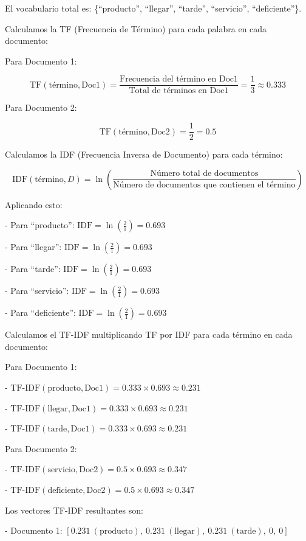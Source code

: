 \documentclass{matematicasud}
\begin{document}
El vocabulario total es: \{``producto'', ``llegar'', ``tarde'', ``servicio'', ``deficiente''\}.

Calculamos la TF (Frecuencia de Término) para cada palabra en cada documento:

Para Documento 1:

\[
\text{TF}(\text{término}, \text{Doc1}) = \frac{\text{Frecuencia del término en Doc1}}{\text{Total de términos en Doc1}} = \frac{1}{3} \approx 0.333
\]

Para Documento 2:

\[
\text{TF}(\text{término}, \text{Doc2}) = \frac{1}{2} = 0.5
\]

Calculamos la IDF (Frecuencia Inversa de Documento) para cada término:

\[
\text{IDF}(\text{término}, D) = \ln \left( \frac{\text{Número total de documentos}}{\text{Número de documentos que contienen el término}} \right)
\]

Aplicando esto:

- Para ``producto'': \(\text{IDF} = \ln \left( \frac{2}{1} \right) = 0.693\)

- Para ``llegar'': \(\text{IDF} = \ln \left( \frac{2}{1} \right) = 0.693\)

- Para ``tarde'': \(\text{IDF} = \ln \left( \frac{2}{1} \right) = 0.693\)

- Para ``servicio'': \(\text{IDF} = \ln \left( \frac{2}{1} \right) = 0.693\)

- Para ``deficiente'': \(\text{IDF} = \ln \left( \frac{2}{1} \right) = 0.693\)

Calculamos el TF-IDF multiplicando TF por IDF para cada término en cada documento:

Para Documento 1:

- \(\text{TF-IDF}(\text{producto}, \text{Doc1}) = 0.333 \times 0.693 \approx 0.231\)

- \(\text{TF-IDF}(\text{llegar}, \text{Doc1}) = 0.333 \times 0.693 \approx 0.231\)

- \(\text{TF-IDF}(\text{tarde}, \text{Doc1}) = 0.333 \times 0.693 \approx 0.231\)

Para Documento 2:

- \(\text{TF-IDF}(\text{servicio}, \text{Doc2}) = 0.5 \times 0.693 \approx 0.347\)

- \(\text{TF-IDF}(\text{deficiente}, \text{Doc2}) = 0.5 \times 0.693 \approx 0.347\)

Los vectores TF-IDF resultantes son:

- Documento 1: \([0.231\ (\text{producto}),\ 0.231\ (\text{llegar}),\ 0.231\ (\text{tarde}),\ 0,\ 0]\)
\end{document}
